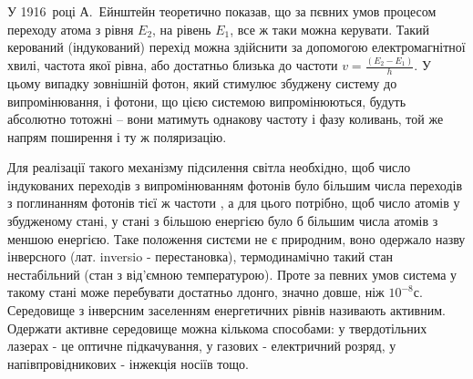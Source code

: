 \documentclass[twocolumn]{el-author}
\begin{document}
У 1916~році А.~Ейнштейн теоретично показав, що за пєвних умов
процесом переходу атома з рівня $E_{2}$, на рівень $E_{1}$, все ж таки можна керувати.
Такий керований (індукований) перехід можна здійснити за допомогою
електромагнітної хвилі, частота якої рівна, або достатньо близька до частоти
$v = \frac{(E_{2} - E_{1})}{h}$.
У цьому випадку зовнішній фотон, який стимулює збуджену
систему до випромінювання, і фотони, що цією системою випромінюються,
будуть абсолютно тотожні -- вони матимуть однакову частоту і фазу
коливань, той же напрям поширення і ту ж поляризацію.

Для реалізації такого механізму підсилення світла необхідно, щоб
число індукованих переходів з випромінюванням фотонів було більшим
числа переходів з поглинанням фотонів тієї ж частоти , а для цього потрібно,
щоб число атомів у збудженому стані, у стані з більшою енергією було б
більшим числа атомів з меншою енергією. Таке положення систєми не є
природним, воно одержало назву інверсного (лат. inversio - перестановка),
термодинамічно такий стан нестабільний (стан з від'ємною температурою).
Проте за певних умов система у такому стані може перебувати достатньо
лдонго, значно довше, ніж $10^{-8}$с. Середовище з інверсним заселенням
енергетичних рівнів називають активним. Одержати активне середовище
можна кількома способами: у твердотільних лазерах - це оптичне
підкачування, у газових - електричний розряд, у напівпровідникових -
інжекція носіїв тощо.

\begin{figure}[h]
\caption{\source{}}
\label{img:1}
\end{figure}
\end{document}
